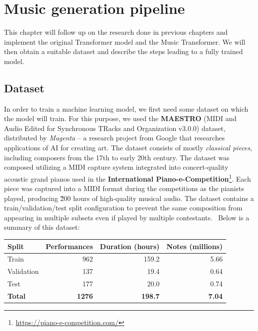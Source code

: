 \chapter{Music generation pipeline}\label{ch:music-generation-pipeline}

\begin{chapterabstract}
    This chapter will follow up on the research done in previous chapters and implement the original Transformer model and the Music Transformer.
    We will then obtain a suitable dataset and describe the steps leading to a fully trained model.
\end{chapterabstract}


\section{Dataset}\label{sec:dataset}

In order to train a machine learning model, we first need some dataset on which the model will train.
For this purpose, we used the \textbf{MAESTRO} (MIDI and Audio Edited for Synchronous TRacks and Organization v3.0.0) dataset\cite{maestro}, distributed by \textit{Magenta} -- a research project from Google that researches applications of AI for creating art.
The dataset consists of mostly \textit{classical pieces}, including composers from the 17th to early 20th century.
The dataset was composed utilizing a MIDI capture system integrated into concert-quality acoustic grand pianos used in the \textbf{International Piano-e-Competition}\footnote{\url{https://piano-e-competition.com/}}.
Each piece was captured into a MIDI format during the competitions as the pianists played, producing \~200 hours of high-quality musical audio.
The dataset contains a train/validation/test split configuration to prevent the same composition from appearing in multiple subsets even if played by multiple contestants.~\cite{maestro}
Below is a summary of this dataset:

\begin{center}
    \begin{tabular}{|l|r|r|r|}
        \hline
        \textbf{Split} & \textbf{Performances} & \textbf{Duration (hours)} & \textbf{Notes (millions)} \\
        \hline
        Train          & 962                   & 159.2                     & 5.66                      \\
        \hline
        Validation     & 137                   & 19.4                      & 0.64                      \\
        \hline
        Test           & 177                   & 20.0                      & 0.74                      \\
        \hline
        \textbf{Total} & \textbf{1276}         & \textbf{198.7}            & \textbf{7.04}             \\
        \hline
    \end{tabular}
\end{center}


